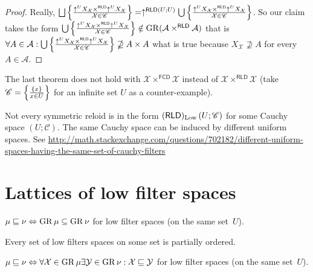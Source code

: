 \begin{proof}
  Really, $\bigsqcup \setcond{ \uparrow^U X_{\mathcal{X}}
  \times^{\mathsf{RLD}} \uparrow^U X_{\mathcal{X}} }{
  \mathcal{X} \in \mathscr{C} } =
  \uparrow^{\mathsf{RLD} (U ; U)} \bigcup \setcond{ \uparrow^U X_{\mathcal{X}}
  \times^{\mathsf{RLD}} \uparrow^U X_{\mathcal{X}} }{
  \mathcal{X} \in \mathscr{C} }$. So our claim takes the form $\bigcup \left\{ \frac{ \uparrow^U X_{\mathcal{X}}
  \times^{\mathsf{RLD}} \uparrow^U X_{\mathcal{X}} }{
  \mathcal{X} \in \mathscr{C} }\right\} \notin \operatorname{GR} (\mathcal{A}
  \times^{\mathsf{RLD}} \mathcal{A})$ that is $\forall A \in
  \mathcal{A} : \bigcup \left\{ \frac{ \uparrow^U X_{\mathcal{X}}
  \times^{\mathsf{RLD}} \uparrow^U X_{\mathcal{X}} }{
  \mathcal{X} \in \mathscr{C} }\right\} \nsupseteq
  A \times A$ what is true because $X_{\mathcal{X}} \nsupseteq A$ for every $A
  \in \mathcal{A}$.
\end{proof}

\begin{rem}
  The last theorem does not hold with $\mathcal{X}
  \times^{\mathsf{FCD}} \mathcal{X}$ instead of $\mathcal{X}
  \times^{\mathsf{RLD}} \mathcal{X}$ (take $\mathscr{C} = \left\{ \frac{ \{ x
  \} }{x \in U}\right\}$ for an infinite set $U$ as a counter-example).
\end{rem}

\begin{rem}
  Not every symmetric reloid is in the form
  $(\mathsf{RLD})_{\operatorname{Low}} \left( U ; \mathscr{C} \right)$ for some
  Cauchy space $\left( U ; \mathscr{C} \right)$. The same Cauchy space can be
  induced by different uniform spaces. See
  \url{http://math.stackexchange.com/questions/702182/different-uniform-spaces-having-the-same-set-of-cauchy-filters}
\end{rem}

\section{Lattices of low filter spaces}

\begin{defn}
$\mu \sqsubseteq \nu \Leftrightarrow \operatorname{GR}\mu\subseteq\operatorname{GR}\nu$ for low filter spaces (on the same set~$U$).
\end{defn}

\begin{obvious}
Every set of low filters spaces on some set is partially ordered.
\end{obvious}

\begin{prop}\label{ls-order2}
$\mu \sqsubseteq \nu \Leftrightarrow \forall \mathcal{X}\in\operatorname{GR}\mu \exists\mathcal{Y}\in\operatorname{GR}\nu: \mathcal{X}\sqsubseteq\mathcal{Y}$ for
low filter spaces (on the same set~$U$).
\end{prop}

